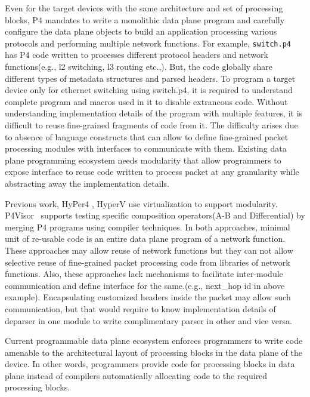Even for the target devices with the same architecture and set of processing blocks, P4 mandates to write a monolithic data plane program and carefully configure the data plane objects to build an application processing various protocols and performing multiple network functions.
For example, \texttt{switch.p4} \cite{switch.p4} has P4 code written to processes different protocol headers and network functions(e.g., l2 switching, l3 routing etc.,). 
But, the code globally share different types of metadata structures and parsed headers.
To program a target device only for ethernet switching using switch.p4, it is required to understand complete program and macros used in it to disable extraneous code.
Without understanding implementation details of the program with multiple features, it is difficult to reuse fine-grained fragments of code from it.
The difficulty arises due to absence of language constructs that can allow to define fine-grained packet processing modules with interfaces to communicate with them.
Existing data plane programming ecosystem needs modularity that allow programmers to expose interface to reuse code written to process packet at any granularity while abstracting away the implementation details.




Previous work, HyPer4 \cite{Hancock:2016:HUP:2999572.2999607}, HyperV \cite{8038396} use virtualization to support modularity.
P4Visor~\cite{Zheng:2018:PLV:3281411.3281436} supports testing specific composition operators(A-B and Differential) by merging P4 programs using compiler techniques.
In both approaches, minimal unit of re-usable code is an entire data plane program of a network function. 
These approaches may allow reuse of network functions but they can not allow selective reuse of fine-grained packet processing code from libraries of network functions.
Also, these approaches lack mechanisms to facilitate inter-module communication and define interface for the same.(e.g., next\_hop id in above example).
Encapsulating customized headers inside the packet may allow such communication, but that would require to know implementation details of deparser in one module to write complimentary parser in other and vice versa. 


Current programmable data plane ecosystem enforces programmers to write code amenable to the architectural layout of processing blocks in the data plane of the device.
In other words, programmers provide code for processing blocks in data plane instead of compilers automatically allocating code to the required processing blocks.

